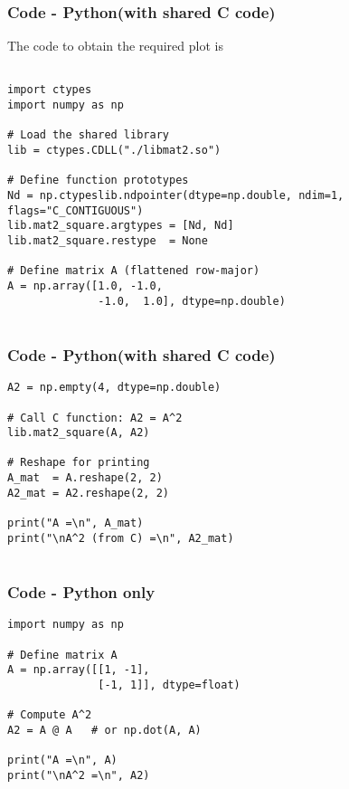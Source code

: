 \documentclass{beamer}
\theoremstyle{remark}
\numberwithin{equation}{section}
\begin{document}
\begin{frame}[fragile]
    \frametitle{Code - Python(with shared C code)}
    The code to obtain the required plot is
    \begin{lstlisting}

import ctypes
import numpy as np

# Load the shared library
lib = ctypes.CDLL("./libmat2.so")

# Define function prototypes
Nd = np.ctypeslib.ndpointer(dtype=np.double, ndim=1, flags="C_CONTIGUOUS")
lib.mat2_square.argtypes = [Nd, Nd]
lib.mat2_square.restype  = None

# Define matrix A (flattened row-major)
A = np.array([1.0, -1.0,
              -1.0,  1.0], dtype=np.double)


\end{lstlisting}
\end{frame}
\begin{frame}[fragile]
\frametitle{Code - Python(with shared C code)}
\begin{lstlisting}
A2 = np.empty(4, dtype=np.double)

# Call C function: A2 = A^2
lib.mat2_square(A, A2)

# Reshape for printing
A_mat  = A.reshape(2, 2)
A2_mat = A2.reshape(2, 2)

print("A =\n", A_mat)
print("\nA^2 (from C) =\n", A2_mat)


\end{lstlisting}
\end{frame}




\begin{frame}[fragile]
\frametitle{Code - Python only}
\begin{lstlisting}
import numpy as np

# Define matrix A
A = np.array([[1, -1],
              [-1, 1]], dtype=float)

# Compute A^2
A2 = A @ A   # or np.dot(A, A)

print("A =\n", A)
print("\nA^2 =\n", A2)




\end{lstlisting}
\end{frame}
\end{document}
